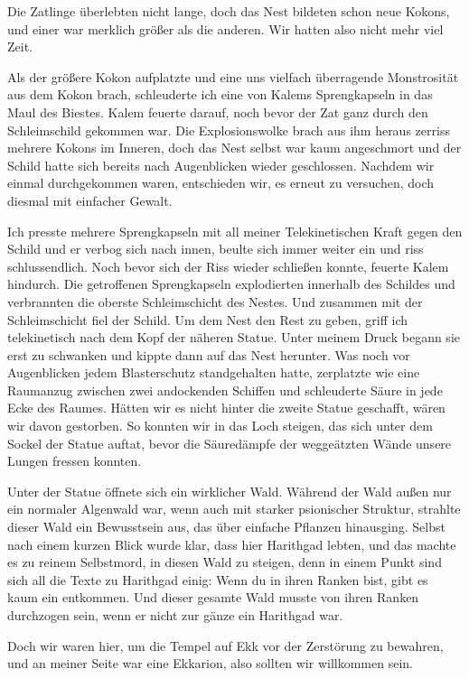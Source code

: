 \documentclass[11pt]{article}
\begin{document}
Die Zatlinge überlebten nicht lange, doch das Nest bildeten schon neue
Kokons, und einer war merklich größer als die anderen. Wir hatten also
nicht mehr viel Zeit.

Als der größere Kokon aufplatzte und eine uns vielfach überragende
Monstrosität aus dem Kokon brach, schleuderte ich eine von Kalems
Sprengkapseln in das Maul des Biestes. Kalem feuerte darauf, noch bevor
der Zat ganz durch den Schleimschild gekommen war. Die Explosionswolke
brach aus ihm heraus zerriss mehrere Kokons im Inneren, doch das Nest
selbst war kaum angeschmort und der Schild hatte sich bereits nach
Augenblicken wieder geschlossen. Nachdem wir einmal durchgekommen waren,
entschieden wir, es erneut zu versuchen, doch diesmal mit einfacher
Gewalt.

Ich presste mehrere Sprengkapseln mit all meiner Telekinetischen Kraft
gegen den Schild und er verbog sich nach innen, beulte sich immer weiter
ein und riss schlussendlich. Noch bevor sich der Riss wieder schließen
konnte, feuerte Kalem hindurch. Die getroffenen Sprengkapseln
explodierten innerhalb des Schildes und verbrannten die oberste
Schleimschicht des Nestes. Und zusammen mit der Schleimschicht fiel der
Schild. Um dem Nest den Rest zu geben, griff ich telekinetisch nach dem
Kopf der näheren Statue. Unter meinem Druck begann sie erst zu schwanken
und kippte dann auf das Nest herunter. Was noch vor Augenblicken jedem
Blasterschutz standgehalten hatte, zerplatzte wie eine Raumanzug
zwischen zwei andockenden Schiffen und schleuderte Säure in jede Ecke
des Raumes. Hätten wir es nicht hinter die zweite Statue geschafft,
wären wir davon gestorben. So konnten wir in das Loch steigen, das sich
unter dem Sockel der Statue auftat, bevor die Säuredämpfe der
weggeätzten Wände unsere Lungen fressen konnten.

Unter der Statue öffnete sich ein wirklicher Wald. Während der Wald
außen nur ein normaler Algenwald war, wenn auch mit starker psionischer
Struktur, strahlte dieser Wald ein Bewusstsein aus, das über einfache
Pflanzen hinausging. Selbst nach einem kurzen Blick wurde klar, dass
hier Harithgad lebten, und das machte es zu reinem Selbstmord, in diesen
Wald zu steigen, denn in einem Punkt sind sich all die Texte zu
Harithgad einig: Wenn du in ihren Ranken bist, gibt es kaum ein
entkommen. Und dieser gesamte Wald musste von ihren Ranken durchzogen
sein, wenn er nicht zur gänze ein Harithgad war.

Doch wir waren hier, um die Tempel auf Ekk vor der Zerstörung zu
bewahren, und an meiner Seite war eine Ekkarion, also sollten wir
willkommen sein.
\end{document}
